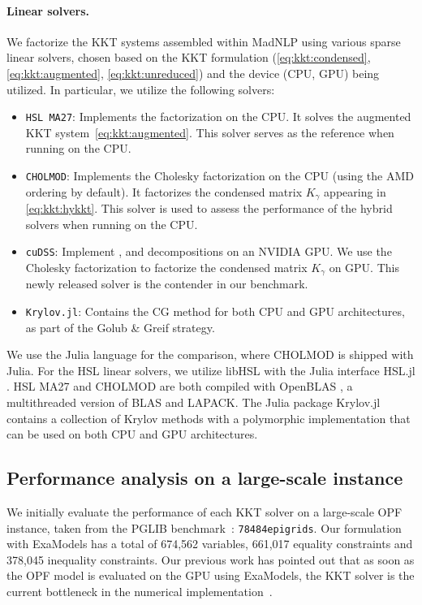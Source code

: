 \paragraph{Linear solvers.}
We factorize the KKT systems assembled within MadNLP using various sparse linear solvers, chosen based on the KKT formulation (\ref{eq:kkt:condensed}, \ref{eq:kkt:augmented}, \ref{eq:kkt:unreduced}) and the device (CPU, GPU) being utilized.
In particular, we utilize the following solvers:
\begin{itemize}
  \item {\tt HSL MA27}: Implements the \lblt factorization on the CPU.
    It solves the augmented KKT system~\eqref{eq:kkt:augmented}.
    This solver serves as the reference when running on the CPU.
  \item {\tt CHOLMOD}: Implements the Cholesky factorization on the CPU %
    (using the AMD ordering \cite{amestoy-david-duff-2004} by default).
    It factorizes the condensed matrix $K_\gamma$ appearing in \eqref{eq:kkt:hykkt}.
    This solver is used to assess the performance of the hybrid solvers when running on the CPU.
  \item {\tt cuDSS}: Implement \llt, \ldlt and \lu decompositions on an NVIDIA GPU.
    We use the Cholesky factorization to factorize the condensed matrix $K_\gamma$ on GPU.
    This newly released solver is the contender in our benchmark.
  \item {\tt Krylov.jl}: Contains the CG method for both CPU and GPU architectures, as part of the Golub \& Greif strategy.
\end{itemize}

We use the Julia language \cite{bezanson-edelman-karpinski-shah-2017} for the comparison, where CHOLMOD \cite{chen-davis-hager-rajamanickam-2008} is shipped with Julia.
For the HSL linear solvers, we utilize libHSL \cite{fowkes-lister-montoison-orban-2024} with the Julia interface HSL.jl \cite{montoison-orban-hsl-2021}.
HSL MA27 and CHOLMOD are both compiled with OpenBLAS \cite{openblas}, a multithreaded version of BLAS and LAPACK.
The Julia package Krylov.jl~\cite{montoison2023krylov} contains a collection of Krylov methods with a polymorphic implementation that can be used on both CPU and GPU architectures.

\subsection{Performance analysis on a large-scale instance}
\label{sec:num:pprof}
We initially evaluate the performance of each KKT solver on a large-scale OPF instance, taken from
the PGLIB benchmark~\cite{babaeinejadsarookolaee2019power}: {\tt 78484epigrids}.
Our formulation with ExaModels has
a total of 674,562 variables, 661,017 equality constraints and 378,045
inequality constraints.
Our previous work has pointed out that as soon as the OPF model is
evaluated on the GPU using ExaModels, the KKT solver is the current bottleneck
in the numerical implementation~\cite{shin2023accelerating}.

